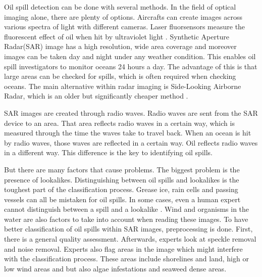 \hspace{0.5cm} Oil spill detection can be done with several methods. In the field of optical imaging alone, there are plenty of options. Aircrafts can create images across various spectra of light with different cameras. Laser fluorsensors measure the fluorescent effect of oil when hit by ultraviolet light \cite{fingas2014review}. Synthetic Aperture Radar(SAR) image has a high resolution, wide area coverage and moreover images can be taken day and night under any weather condition. This enables oil spill investigators to monitor oceans 24 hours a day\cite{Chang20081915}. The advantage of this is that large areas can be checked for spills, which is often required when checking oceans. The main alternative within radar imaging is Side-Looking Airborne Radar, which is an older but significantly cheaper method \cite{fingas2014review}. 

SAR images are created through radio waves. Radio waves are sent from the SAR device to an area. That area reflects radio waves in a certain way, which is measured through the time the waves take to travel back. \cite{Doerry:04} When an ocean is hit by radio waves, those waves are reflected in a certain way. Oil reflects radio waves in a different way. This difference is the key to identifying oil spills.

But there are many factors that cause problems. The biggest problem is the presence of lookalikes. Distinguishing between oil spills and lookalikes is the toughest part of the classification process. Grease ice, rain cells and passing vessels can all be mistaken for oil spills\cite{Brekke200595}. In some cases, even a human expert cannot distinguish between a spill and a lookalike \cite{Keramitsoglou2006640}. Wind and organisms in the water are also factors to take into account when reading these images. To have better classification of oil spills within SAR images, preprocessing is done. First, there is a general quality assessment. Afterwards, experts look at speckle removal and noise removal. Experts also flag areas in the image which might interfere with the classification process. These areas include shorelines and land, high or low wind areas and but also algae infestations and seaweed dense areas\cite{fingas2014review}.



